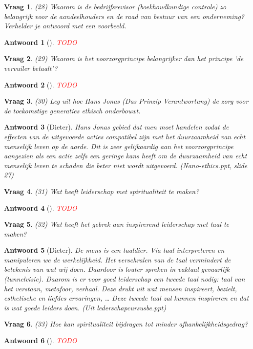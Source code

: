 \documentclass{article}
\theoremstyle{nonumberplain}
\newtheorem{question}{Vraag}
\newtheorem{answer}{Antwoord}
\begin{document}
\begin{question}
(28)	Waarom is de bedrijfsrevisor (boekhoudkundige controle) zo belangrijk voor de aandeelhouders en de raad van bestuur van een onderneming? Verhelder je antwoord met een voorbeeld.
\end{question}
\begin{answer}[]
\textcolor{red}{TODO}%
\end{answer}

\begin{question}
(29)	Waarom is het voorzorgprincipe belangrijker dan het principe `de vervuiler betaalt'? 
\end{question}
\begin{answer}[]
\textcolor{red}{TODO}%
\end{answer}

\begin{question}
(30)	Leg uit hoe Hans Jonas (Das Prinzip Verantwortung) de zorg voor de toekomstige generaties ethisch onderbouwt.
\end{question}
\begin{answer}[Dieter]
	Hans Jonas gebied dat men moet handelen zodat de effecten van de uitgevoerde acties compatibel zijn met het duurzaamheid van echt menselijk leven op de aarde.
	Dit is zeer gelijkaardig aan het voorzorgprincipe aangezien als een actie zelfs een geringe kans heeft om de duurzaamheid van echt menselijk leven te schaden die beter niet wordt uitgevoerd.
	\textit{(Nano-ethics.ppt, slide 27)}
\end{answer}

\begin{question}
(31)	Wat heeft leiderschap met spiritualiteit te maken? 
\end{question}
\begin{answer}[]
\textcolor{red}{TODO}%
\end{answer}

\begin{question}
(32)	Wat heeft het gebrek aan inspirerend leiderschap met taal te maken? 
\end{question}
\begin{answer}[Dieter]
	De mens is een taaldier.
	Via taal interpreteren en manipuleren we de werkelijkheid. 
	Het verschralen van de taal vermindert de betekenis van wat wij doen.
	Daardoor is louter spreken in vaktaal gevaarlijk (tunnelvisie).
	Daarom is er voor goed leiderschap een tweede taal nodig: taal van het verstaan, metafoor, verhaal.
	Deze drukt uit wat mensen inspireert, bezielt, esthetische en liefdes ervaringen, \dots
	Deze tweede taal zal kunnen inspireren en dat is wat goede leiders doen.
	\textit{(Uit lederschapcursusbe.ppt)}
\end{answer}

\begin{question}
(33)	Hoe kan spiritualiteit bijdragen tot minder afhankelijkheidsgedrag? 
\end{question}
\begin{answer}[]
\textcolor{red}{TODO}%
\end{answer}

\nocite{*}
\printbibliography
\end{document}
